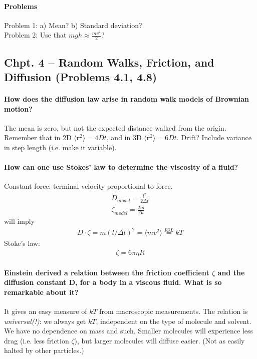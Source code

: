 \documentclass[a4paper,12pt]{article}
\begin{document}
            \paragraph{Problems}
               Problem 1: a) Mean? b) Standard deviation? \\
               Problem 2: Use that $mgh \approx \frac{mv^2}{2}$?

      \subsection{Chpt. 4 – Random Walks, Friction, and Diffusion (Problems 4.1, 4.8)}
         \paragraph{
            How does the diffusion law arise in random walk models of Brownian motion?
         }
            The mean is zero, but not the expected distance walked from the
            origin. Remember that in 2D $\langle \mathbf r^2\rangle = 4Dt$, and
            in 3D $\langle \mathbf r^2\rangle = 6Dt$. Drift? Include variance
            in step length (i.e. make it variable).
         \paragraph{
            How can one use Stokes’ law to determine the viscosity of a fluid?
         }
            Constant force: terminal velocity proportional to force.
            \begin{align*}
               D_{model} = \frac{l^2}{2\Delta t} \\
               \zeta_{model} = \frac{2m}{\Delta t}
            \end{align*}
            will imply
            \begin{align*}
               D\cdot\zeta = m(l/\Delta t)^2 = \langle mv^2 \rangle
               \stackrel{IGL}{=} kT
            \end{align*}
            Stoke's law:
            \begin{align*}
               \zeta = 6\pi\eta R
            \end{align*}
         \paragraph{
            Einstein derived a relation between the friction coefficient $\zeta$ and the diffusion constant
            D, for a body in a viscous fluid. What is so remarkable about it?
         }
            It gives an easy measure of $kT$ from macroscopic measurements.
            The relation is \emph{universal(!)}: we always get $kT$,
            independent on the type of molecule and solvent. We have no
            dependence on mass and such. Smaller molecules will experience
            less drag (i.e. less friction $\zeta$), but larger molecules will
            diffuse easier. (Not as easily halted by other particles.)  
\end{document}

